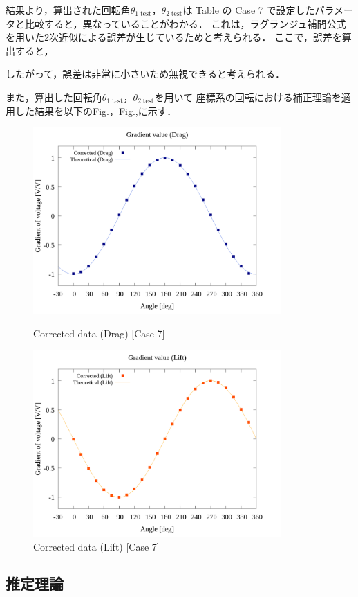 結果より，算出された回転角$\theta_{1\;\mathrm{test}}$，$\theta_{2\;\mathrm{test}}$は
Table の Case 7 で設定したパラメータと比較すると，異なっていることがわかる．
これは，ラグランジュ補間公式を用いた2次近似による誤差が生じているためと考えられる．
ここで，誤差を算出すると，

したがって，誤差は非常に小さいため無視できると考えられる．

また，算出した回転角$\theta_{1\;\mathrm{test}}$，$\theta_{2\;\mathrm{test}}$を用いて
座標系の回転における補正理論を適用した結果を以下のFig.，Fig.,に示す．

\begin{figure}
    \footnotesize
    \begin{center}
        \includegraphics[width=95mm]{../../02_workspace/result/simulation_tx=10.0_ty=-5.0_dx=5.00_dy=-2.50/plot/21/21-4_corrected_angle_drag.png}
        \caption{Corrected data (Drag) [Case 7]}
        \includegraphics[width=95mm]{../../02_workspace/result/simulation_tx=10.0_ty=-5.0_dx=5.00_dy=-2.50/plot/21/21-4_corrected_angle_lift.png}
        \caption{Corrected data (Lift) [Case 7]}
    \end{center}
\end{figure}


\subsection{推定理論}
